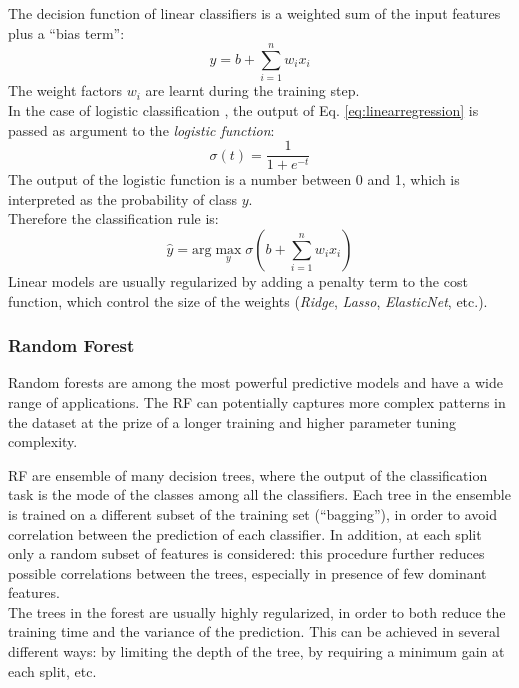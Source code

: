 \documentclass[a4paper,12pt]{article} %
\begin{document}
The decision function of linear classifiers is a weighted sum of the input features plus a ``bias term'':
\begin{equation}
    \label{eq:linearregression}
    y = b + \sum _{i=1} ^{n} w_{i}x_{i}
\end{equation}
The weight factors $w_i$ are learnt during the training step. \\
In the case of logistic classification \cite{wiki-lr}, the output of Eq. \ref{eq:linearregression} is passed
as argument to the \textit{logistic function}:
\begin{equation}
    \sigma(t) = \dfrac{1}{1 + e^{-t}}
\end{equation}
The output of the logistic function is a number between 0 and 1, which is interpreted as the probability of class $y$. \\
Therefore the classification rule is:
\begin{equation}
    \hat{y} = \mathrm{arg} \max_{y} \sigma ( b + \sum _{i=1} ^{n} w_{i}x_{i} )
\end{equation}
Linear models are usually regularized by adding a penalty term to the cost function,
which control the size of the weights (\textit{Ridge}, \textit{Lasso}, \textit{ElasticNet}, etc.).

\subsubsection*{Random Forest}
Random forests \cite{wiki-rndf} are among the most powerful predictive
models and have a wide range of applications.
The RF can potentially captures more complex patterns in the dataset at the prize of a longer training and higher
parameter tuning complexity.

RF are ensemble of many decision trees, where the output of the classification task is
the mode of the classes among all the classifiers.
Each tree in the ensemble is trained on a different subset of the training set (``bagging''), in order to
avoid correlation between the prediction of each classifier.
In addition, at each split only a random subset of features is considered:
this procedure further reduces possible correlations between the trees, especially in
presence of few dominant features. \\
The trees in the forest are usually highly regularized, in order
to both reduce the training time and the variance of the prediction.
This can be achieved in several different ways: by limiting the depth of the tree,
by requiring a minimum gain at each split, etc.
\end{document}
